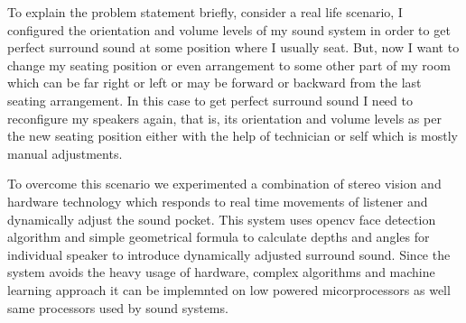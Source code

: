 \documentclass[../../../patent_v1.tex]{subfiles}
\begin{document}
To explain the problem statement briefly, 
consider a real life scenario, I configured the 
orientation and volume levels of my sound system in 
order to get perfect surround sound at some 
position where I usually seat. But, now I want 
to change my seating position or even arrangement 
to some other part of my room which can be far 
right or left or may  be forward  or backward 
from the last seating arrangement. In this case 
to get perfect surround  sound I need to 
reconfigure my speakers again, that is, its 
orientation and volume levels as per the new 
seating position either with the help of technician 
or self which is mostly manual adjustments.

To overcome this scenario we experimented a combination of 
stereo vision and hardware technology which responds to real time
movements of listener and dynamically adjust the sound pocket. This system
uses opencv face detection algorithm and simple geometrical formula to
calculate depths and angles for individual speaker to introduce dynamically
adjusted surround sound. Since the system avoids the heavy usage of hardware, complex
algorithms and machine learning approach it can be implemnted on low powered
micorprocessors as well same processors used by sound systems.
\end{document}
